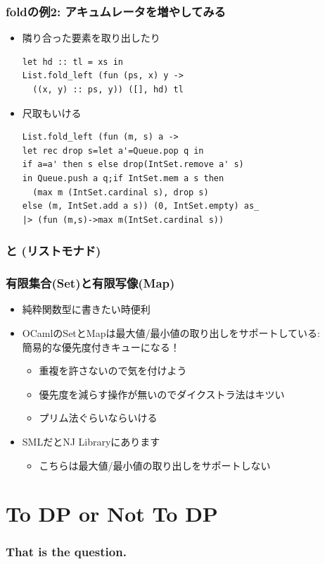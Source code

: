 \documentclass[dvipdfmx,cjk,xcolor=dvipsnames,envcountsect,notheorems,12pt]{beamer}
\theoremstyle{definition}
\begin{document}
\begin{frame}[fragile]
	\frametitle{foldの例2: アキュムレータを増やしてみる}
	\begin{itemize}
		\item 隣り合った要素を取り出したり
			\begin{lstlisting}
let hd :: tl = xs in
List.fold_left (fun (ps, x) y ->
  ((x, y) :: ps, y)) ([], hd) tl
\end{lstlisting}

		\item 尺取もいける
			\begin{lstlisting}
List.fold_left (fun (m, s) a ->
let rec drop s=let a'=Queue.pop q in
if a=a' then s else drop(IntSet.remove a' s)
in Queue.push a q;if IntSet.mem a s then
  (max m (IntSet.cardinal s), drop s)
else (m, IntSet.add a s)) (0, IntSet.empty) as_
|> (fun (m,s)->max m(IntSet.cardinal s))
\end{lstlisting}
	\end{itemize}
\end{frame}

\begin{frame}
	\frametitle{と (リストモナド)}
\end{frame}

\begin{frame}
	\frametitle{有限集合(Set)と有限写像(Map)}
	\begin{itemize}
		\item 純粋関数型に書きたい時便利
		\item OCamlのSetとMapは最大値/最小値の取り出しをサポートしている:\\
			簡易的な優先度付きキューになる！
			\begin{itemize}
				\item 重複を許さないので気を付けよう
				\item 優先度を減らす操作が無いのでダイクストラ法はキツい
				\item プリム法ぐらいならいける
			\end{itemize}
		\item SMLだとNJ Libraryにあります
			\begin{itemize}
				\item こちらは最大値/最小値の取り出しをサポートしない
			\end{itemize}
	\end{itemize}
\end{frame}

\section{To DP or Not To DP\:}

\begin{frame}[fragile]
	\frametitle{That is the question.}

\end{frame}
\end{document}
